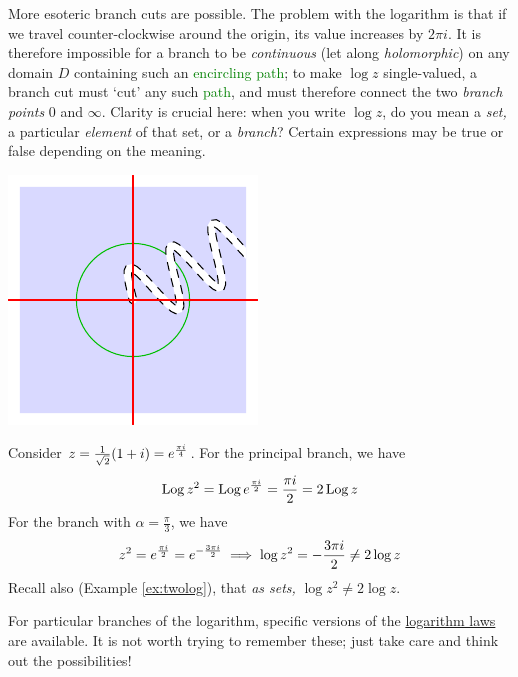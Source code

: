 \goodbreak

\begin{minipage}[t]{0.7\linewidth}\vspace{0pt}
More esoteric branch cuts are possible. The problem with the logarithm is that if we travel counter-clockwise around the origin, its value increases by $2\pi i$. It is therefore impossible for a branch to be \emph{continuous} (let along \emph{holomorphic}) on any domain $D$ containing such an \textcolor{Green}{encircling path}; to make $\log z$ single-valued, a branch cut must `cut' any such \textcolor{Green}{path}, and must therefore connect the two \emph{branch points} 0 and $\infty$.\smallbreak
Clarity is crucial here: when you write $\log z$, do you mean a \emph{set,} a particular \emph{element} of that set, or a \emph{branch}? Certain expressions may be true or false depending on the meaning.
\end{minipage}\begin{minipage}[t]{0.3\linewidth}\vspace{0pt}
\flushright\includegraphics{branch3}
\end{minipage}



\begin{example}{}{}
Consider $z=\frac 1{\sqrt 2}(1+i)=e^{\frac{\pi i}{4}}$. For the principal branch, we have
\[\operatorname{Log} z^2=\operatorname{Log} e^{\frac{\pi i}{2}} =\frac{\pi i}2 =2\operatorname{Log} z\]
For the branch with $\alpha=\frac\pi 3$, we have
\[z^2=e^{\frac{\pi i}{2}}=e^{-\frac{3\pi i}{2}}\implies \log z^2=-\frac{3\pi i}2 \neq 2\log z\]
Recall also (Example \ref{ex:twolog}), that \emph{as sets,} $\log z^2\neq 2\log z$. 
\end{example}

For particular branches of the logarithm, specific versions of the \hyperref[sec:loglaws]{logarithm laws} are available. It is not worth trying to remember these; just take care and think out the possibilities!

